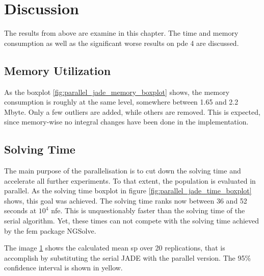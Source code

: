 \documentclass[./\jobname.tex]{subfiles}
\begin{document}
\section{Discussion}

The results from above are examine in this chapter. The time and memory consumption as well as the significant worse results on \gls{pde} 4 are discussed. 

\subsection{Memory Utilization}
As the boxplot \ref{fig:parallel_jade_memory_boxplot} shows, the memory consumption is roughly at the same level, somewhere between 1.65 and 2.2 Mbyte. Only a few outliers are added, while others are removed. This is expected, since memory-wise no integral changes have been done in the implementation.  

\subsection{Solving Time}
The main purpose of the parallelisation is to cut down the solving time and accelerate all further experiments. To that extent, the population is evaluated in parallel. As the solving time boxplot in figure \ref{fig:parallel_jade_time_boxplot} shows, this goal was achieved. The solving time ranks now between 36 and 52 seconds at $10^4$ \gls{nfe}. This is unquestionably faster than the solving time of the serial algorithm. Yet, these times can not compete with the solving time achieved by the \gls{fem} package NGSolve. 

The image \ref{fig:serial_to_parallel_speedup} shows the calculated mean \gls{sp} over 20 replications, that is accomplish by substituting the serial JADE with the parallel version. The 95\% confidence interval is shown in yellow. 

\begin{figure}[H]
	\centering
	\noindent{}
	\label{fig:serial_to_parallel_speedup}
\end{figure}
\end{document}
